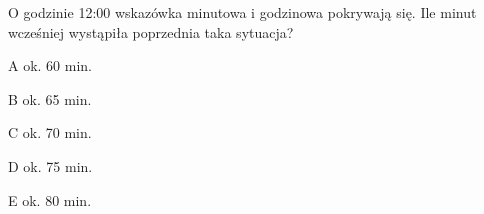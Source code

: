 \begin{tresc}
O godzinie 12:00 wskazówka minutowa i godzinowa pokrywają się. Ile minut wcześniej wystąpiła poprzednia taka sytuacja?
\end{tresc}
\begin{wariant}{A} ok. 60 min. \end{wariant}
\begin{wariant}{B} ok. 65 min. \end{wariant}
\begin{wariant}{C} ok. 70 min. \end{wariant}
\begin{wariant}{D} ok. 75 min. \end{wariant}
\begin{wariant}{E} ok. 80 min. \end{wariant}
